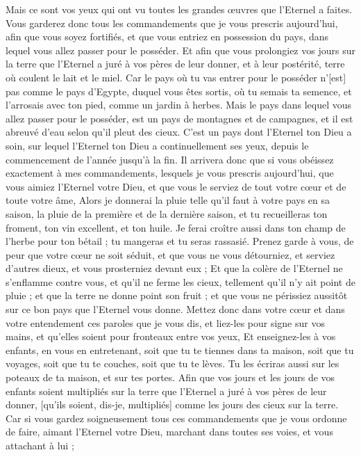 \begin{multicols}{2}
Mais ce sont vos yeux qui ont vu toutes les grandes œuvres que l'Eternel a faites.
Vous garderez donc tous les commandements que je vous prescris aujourd'hui, afin que vous soyez fortifiés, et que vous entriez en possession du pays, dans lequel vous allez passer pour le posséder.
Et afin que vous prolongiez vos jours sur la terre que l'Eternel a juré à vos pères de leur donner, et à leur postérité, terre où coulent le lait et le miel.
Car le pays où tu vas entrer pour le posséder n'[est] pas comme le pays d'Egypte, duquel vous êtes sortis, où tu semais ta semence, et l'arrosais avec ton pied, comme un jardin à herbes.
Mais le pays dans lequel vous allez passer pour le posséder, est un pays de montagnes et de campagnes, et il est abreuvé d'eau selon qu'il pleut des cieux.
C'est un pays dont l'Eternel ton Dieu a soin, sur lequel l'Eternel ton Dieu a continuellement ses yeux, depuis le commencement de l'année jusqu'à la fin.
Il arrivera donc que si vous obéissez exactement à mes commandements, lesquels je vous prescris aujourd'hui, que vous aimiez l'Eternel votre Dieu, et que vous le serviez de tout votre cœur et de toute votre âme,
Alors je donnerai la pluie telle qu'il faut à votre pays en sa saison, la pluie de la première et de la dernière saison, et tu recueilleras ton froment, ton vin excellent, et ton huile.
Je ferai croître aussi dans ton champ de l'herbe pour ton bétail ; tu mangeras et tu seras rassasié.
Prenez garde à vous, de peur que votre cœur ne soit séduit, et que vous ne vous détourniez, et serviez d'autres dieux, et vous prosterniez devant eux ;
Et que la colère de l'Eternel ne s'enflamme contre vous, et qu'il ne ferme les cieux, tellement qu'il n'y ait point de pluie ; et que la terre ne donne point son fruit ; et que vous ne périssiez aussitôt sur ce bon pays que l'Eternel vous donne.
Mettez donc dans votre cœur et dans votre entendement ces paroles que je vous dis, et liez-les pour signe sur vos mains, et qu'elles soient pour fronteaux entre vos yeux,
Et enseignez-les à vos enfants, en vous en entretenant, soit que tu te tiennes dans ta maison, soit que tu voyages, soit que tu te couches, soit que tu te lèves.
Tu les écriras aussi sur les poteaux de ta maison, et sur tes portes.
Afin que vos jours et les jours de vos enfants soient multipliés sur la terre que l'Eternel a juré à vos pères de leur donner, [qu'ils soient, dis-je, multipliés] comme les jours des cieux sur la terre.
Car si vous gardez soigneusement tous ces commandements que je vous ordonne de faire, aimant l'Eternel votre Dieu, marchant dans toutes ses voies, et vous attachant à lui ;

\end{multicols}
